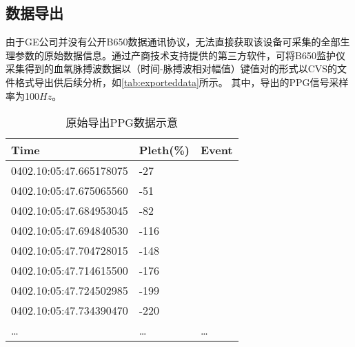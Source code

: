 \subsection{数据导出}
由于GE公司并没有公开B650数据通讯协议，无法直接获取该设备可采集的全部生理参数的原始数据信息。通过产商技术支持提供的第三方软件，可将B650监护仪采集得到的血氧脉搏波数据以（时间-脉搏波相对幅值）键值对的形式以CVS的文件格式导出供后续分析，如\autoref{tab:exporteddata}所示。
其中，导出的PPG信号采样率为100$Hz$。
\begin{table}[htbp]
      \centering
      \caption{\label{tab:exporteddata}原始导出PPG数据示意}
      \begin{tabularx}{\linewidth}{X<{\centering}X<{\centering}X<{\centering}}
            \toprule
            \textbf{Time}&\textbf{Pleth(\%)}&\textbf{Event}\\
            \midrule
            0402.10:05:47.665178075&-27&\\
            0402.10:05:47.675065560&-51&\\
            0402.10:05:47.684953045&-82&\\
            0402.10:05:47.694840530&-116&\\
            0402.10:05:47.704728015&-148&\\
            0402.10:05:47.714615500&-176&\\
            0402.10:05:47.724502985&-199&\\
            0402.10:05:47.734390470&-220&\\
            …&…&…\\
            \bottomrule
      \end{tabularx}
\end{table}
